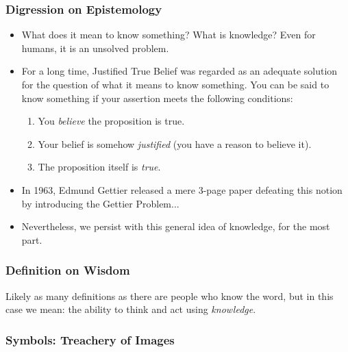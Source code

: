 \documentclass{beamer}
\begin{document}
\begin{frame}
\frametitle{Digression on Epistemology}
\begin{itemize}
  \item What does it mean to know something? What is knowledge? Even for humans, it is an unsolved
  problem.
  \item For a long time, Justified True Belief was regarded as an adequate
  solution for the question of what it means to know something. You can be said
  to know something if your assertion meets the following conditions:
  \begin{enumerate}
    \item You \emph{believe} the proposition is true.
    \item Your belief is somehow \emph{justified} (you have a reason to believe
    it).
    \item The proposition itself is \emph{true}.
  \end{enumerate}
  \item In 1963, Edmund Gettier released a mere 3-page paper defeating this notion by
  introducing the Gettier Problem...
  \item Nevertheless, we persist with this general idea of knowledge, for the
  most part.
\end{itemize}
\end{frame}

\begin{frame}
\frametitle{Definition on Wisdom}

\large{Likely as many definitions as there are people who know the word, but in
this case we mean: the ability to think and act using \emph{knowledge}.}

\end{frame}

\begin{frame}
\frametitle{Symbols: Treachery of Images}

\end{frame}
\end{document}
